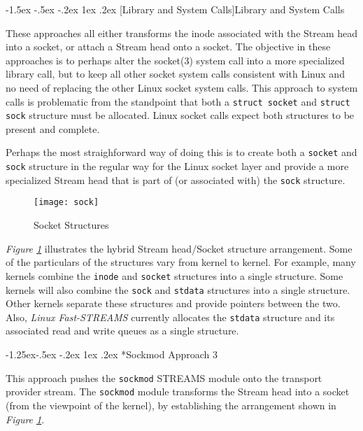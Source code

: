 \documentclass[letterpaper,final,notitlepage,twocolumn,10pt,twoside]{article}
\makeatletter
\renewcommand\subsection{\@startsection{subsection}{2}{\z@}%
                                     {-1.5ex \@plus -.5ex \@minus -.2ex}%
                                     {1ex \@plus .2ex}%
                                     {\normalfont\normalsize\bfseries}}
\renewcommand\subsubsection{\@startsection{subsubsection}{3}{\z@}%
                                     {-1.25ex\@plus -.5ex \@minus -.2ex}%
                                     {1ex \@plus .2ex}%
                                     {\normalfont\normalsize\bfseries}}
\makeatother
\begin{document}
\subsection[Library and System Calls]{Library and System Calls}

These approaches all either transforms the inode associated with the Stream
head into a socket, or attach a Stream head onto a socket.  The objective in
these approaches is to perhaps alter the socket(3) system call into a more
specialized library call, but to keep all other socket system calls consistent
with Linux and no need of replacing the other Linux socket system calls.  This
approach to system calls is problematic from the standpoint that both a
\texttt{struct socket} and \texttt{struct sock} structure must be allocated.
Linux socket calls expect both structures to be present and complete.

Perhaps the most straighforward way of doing this is to create both a
\texttt{socket} and \texttt{sock} structure in the regular way for the Linux
socket layer and provide a more specialized Stream head that is part of (or
associated with) the \texttt{sock} structure.

\begin{figure}[hbtp]
\begin{center}
\texttt{[image: sock]}
\end{center}
\caption[Socket Structures]{Socket Structures}
\label{figure:sock}
\end{figure}

\textit{Figure \ref{figure:sock}} illustrates the hybrid Stream head/Socket
structure arrangement.  Some of the particulars of the structures vary from
kernel to kernel.  For example, many kernels combine the \texttt{inode} and
\texttt{socket} structures into a single structure.  Some kernels will also
combine the \texttt{sock} and \texttt{stdata} structures into a single
structure.  Other kernels separate these structures and provide pointers
between the two.  Also, \textsl{Linux Fast-STREAMS} currently allocates the
\texttt{stdata} structure and its associated read and write queues as a single
structure.

\subsubsection*{Sockmod Approach 3}

This approach pushes the \texttt{sockmod} STREAMS module onto the transport
provider stream.  The \texttt{sockmod} module transforms the Stream head into
a socket (from the viewpoint of the kernel), by establishing the arrangement
shown in \textit{Figure \ref{figure:sock}}.
\end{document}
